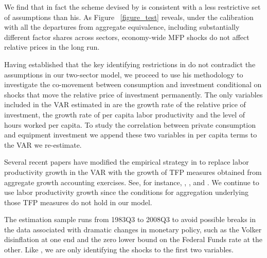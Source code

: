\documentclass[12pt,fleqn]{article}
\begin{document}
{\normalsize We find that in fact the scheme devised by 
is consistent with a less restrictive set of assumptions than his. As Figure~%
\ref{figure_test} reveals, under the calibration with all the departures
from aggregate equivalence, including substantially different factor shares
across sectors, economy-wide MFP shocks do not affect relative prices in the
long run. }

{\normalsize Having established that the key identifying restrictions in %
 do not contradict the assumptions in our two-sector
model, we proceed to use his methodology to investigate the co-movement
between consumption and investment conditional on shocks that move the
relative price of investment permanently. The only variables included in the
VAR estimated in  are the growth rate of the relative
price of investment, the growth rate of per capita labor productivity and
the level of hours worked per capita. To study the correlation between
private consumption and equipment investment we append these two variables
in per capita terms to the VAR we re-estimate. }

{\normalsize Several recent papers have modified the empirical strategy in %
 to replace labor productivity growth in the VAR with the
growth of TFP measures obtained from aggregate growth accounting exercises.
See, for instance, , , and %
. We continue to use labor productivity growth since the
conditions for aggregation underlying those TFP measures do not hold in our
model. }

{\normalsize The estimation sample runs from 1983Q3 to 2008Q3 to avoid
possible breaks in the data associated with dramatic changes in monetary
policy, such as the Volker disinflation at one end and the zero lower bound
on the Federal Funds rate at the other. Like , we are only
identifying the shocks to the first two variables. }
\end{document}
